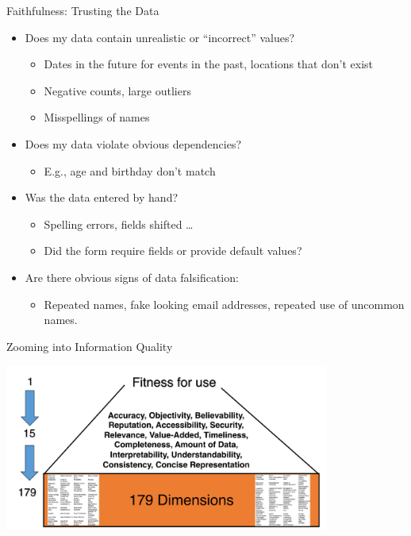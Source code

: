 \documentclass[aspectratio=169]{../latex_main/tntbeamer}  %
\begin{document}
\begin{frame}[c]{Faithfulness: Trusting the Data}
    \begin{itemize}
        \item Does my data contain unrealistic or “incorrect” values?
        \begin{itemize}
            \item Dates in the future for events in the past, locations that don’t exist
            \item Negative counts, large outliers
            \item Misspellings of names
        \end{itemize}
        \item Does my data violate obvious dependencies?
        \begin{itemize}
            \item E.g., age and birthday don’t match
        \end{itemize}
        \item Was the data entered by hand?
        \begin{itemize}
            \item Spelling errors, fields shifted …
            \item Did the form require fields or provide default values?
        \end{itemize}
        \item Are there obvious signs of data falsification:
        \begin{itemize}
            \item Repeated names, fake looking email addresses, repeated use of uncommon names.
        \end{itemize}
    \end{itemize}
\end{frame}

\begin{frame}[c]{Zooming into Information Quality}

    \centering
    \includegraphics[width=0.8\textwidth]{figure/bild12_information_quality.png}

\end{frame}
\end{document}
